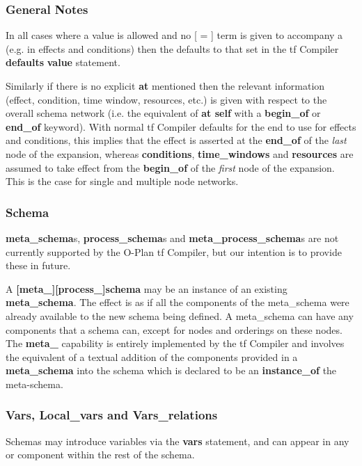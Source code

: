\subsubsection{General Notes}

In all cases where a value is allowed and no [ =  ] term is given
to accompany a  (e.g. in effects and conditions) then the
 defaults to that set in the {\sc tf} Compiler {\bf defaults}
{\bf value} statement.

Similarly if there is no explicit {\bf at}  mentioned then the
relevant information (effect, condition, time window, resources, etc.) is
given with respect to the overall schema network (i.e. the equivalent of {\bf
at self} with a {\bf begin\_of} or {\bf end\_of} keyword).
With normal {\sc tf} Compiler defaults for the end to use for effects and
conditions, this implies that the effect is asserted at the {\bf end\_of} of
the {\em last} node of the expansion, whereas {\bf conditions}, {\bf
time\_windows} and {\bf resources} are assumed to take effect from the {\bf
begin\_of} of the {\em first} node of the expansion.  This is the case for
single and multiple node networks.

\subsubsection{Schema}

{\bf meta\_schema}s, {\bf process\_schema}s and {\bf
meta\_process\_schema}s are not currently supported by the O-Plan {\sc
tf} Compiler, but our intention is to provide these in future. 

A {\bf [meta\_][process\_]schema} may be an instance of an existing {\bf
meta\_schema}.  The effect is as if all the components of the meta\_schema
were already available to the new schema being defined.  A meta\_schema can
have any components that a schema can, except for nodes and orderings on these
nodes.  The {\bf meta\_} capability is entirely implemented by
the {\sc tf} Compiler and involves the equivalent of a textual
addition of the components provided in a {\bf meta\_schema} into
the schema which is declared to be an {\bf instance\_of} the meta-schema.

\subsubsection{Vars, Local\_vars and Vars\_relations}
Schemas may introduce variables via the {\bf vars} statement, and can appear
in any {\tt {}} or {\tt {}} component within
the rest of the schema.

